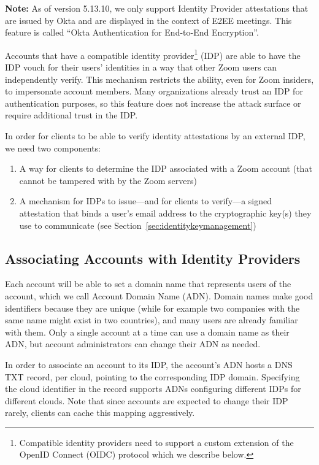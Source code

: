 \textbf{Note:} As of version 5.13.10, we only support Identity Provider attestations that are issued
by Okta and are displayed in the context of E2EE meetings. This feature is called ``Okta
Authentication for End-to-End Encryption''.

Accounts that have a compatible identity provider\footnote{Compatible identity providers need to
support a custom extension of the OpenID Connect (OIDC) protocol which we describe below.} (IDP) are
able to have the IDP vouch for their users' identities in a way that other Zoom users can
independently verify. This mechanism restricts the ability, even for Zoom insiders, to impersonate
account members. Many organizations already trust an IDP for authentication purposes, so this
feature does not increase the attack surface or require additional trust in the IDP.

In order for clients to be able to verify identity attestations by an external IDP, we need two
components:

\begin{enumerate}
\item A way for clients to determine the IDP associated with a Zoom account (that cannot be
    tampered with by the Zoom servers)
\item A mechanism for IDPs to issue---and for clients to verify---a signed attestation that binds a
    user's email address to the cryptographic key(s) they use to communicate (see
    Section~\ref{sec:identitykeymanagement})
\end{enumerate}

\subsection{Associating Accounts with Identity Providers}
\label{subsec:adnToIdp}
Each account will be able to set a domain name that represents users of the account, which we call
Account Domain Name (ADN). Domain names make good identifiers because they are unique (while for
example two companies with the same name might exist in two countries), and many users are already
familiar with them. Only a single account at a time can use a domain name as their ADN, but account
administrators can change their ADN as needed.

In order to associate an account to its IDP, the account's ADN hosts a DNS TXT record, per cloud,
pointing to the corresponding IDP domain. Specifying the cloud identifier in the record supports
ADNs configuring different IDPs for different clouds. Note that since accounts are expected to
change their IDP rarely, clients can cache this mapping aggressively.

